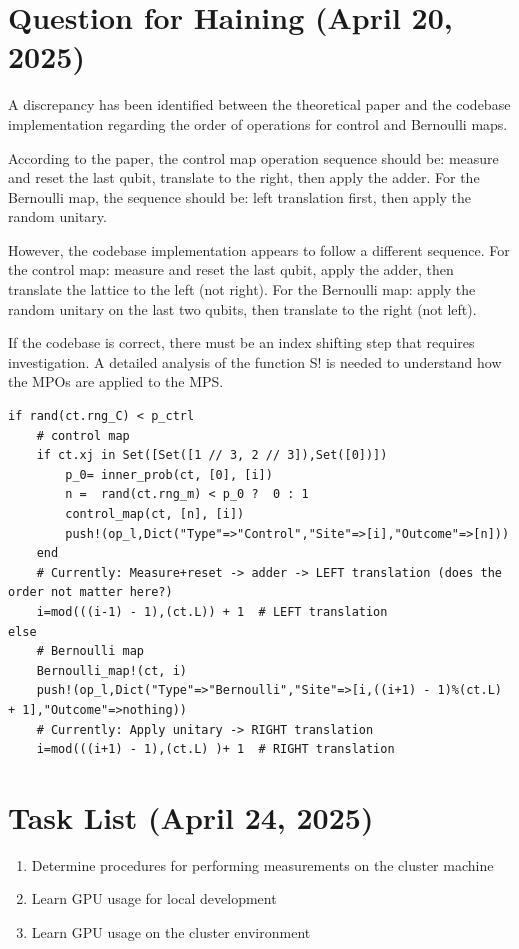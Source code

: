 \documentclass[11pt,a4paper]{article}
\begin{document}
\section{Question for Haining (April 20, 2025)}

A discrepancy has been identified between the theoretical paper and the codebase implementation regarding the order of operations for control and Bernoulli maps.

According to the paper, the control map operation sequence should be: measure and reset the last qubit, translate to the right, then apply the adder. For the Bernoulli map, the sequence should be: left translation first, then apply the random unitary.

However, the codebase implementation appears to follow a different sequence. For the control map: measure and reset the last qubit, apply the adder, then translate the lattice to the left (not right). For the Bernoulli map: apply the random unitary on the last two qubits, then translate to the right (not left).

If the codebase is correct, there must be an index shifting step that requires investigation. A detailed analysis of the function S! is needed to understand how the MPOs are applied to the MPS.

\begin{lstlisting}
if rand(ct.rng_C) < p_ctrl
    # control map
    if ct.xj in Set([Set([1 // 3, 2 // 3]),Set([0])])
        p_0= inner_prob(ct, [0], [i])
        n =  rand(ct.rng_m) < p_0 ?  0 : 1
        control_map(ct, [n], [i])
        push!(op_l,Dict("Type"=>"Control","Site"=>[i],"Outcome"=>[n]))
    end
    # Currently: Measure+reset -> adder -> LEFT translation (does the order not matter here?)
    i=mod(((i-1) - 1),(ct.L)) + 1  # LEFT translation
else
    # Bernoulli map
    Bernoulli_map!(ct, i)
    push!(op_l,Dict("Type"=>"Bernoulli","Site"=>[i,((i+1) - 1)%(ct.L) + 1],"Outcome"=>nothing))
    # Currently: Apply unitary -> RIGHT translation
    i=mod(((i+1) - 1),(ct.L) )+ 1  # RIGHT translation
\end{lstlisting}

\section{Task List (April 24, 2025)}

\begin{enumerate}
    \item Determine procedures for performing measurements on the cluster machine
    \item Learn GPU usage for local development
    \item Learn GPU usage on the cluster environment
\end{enumerate}
\end{document}

